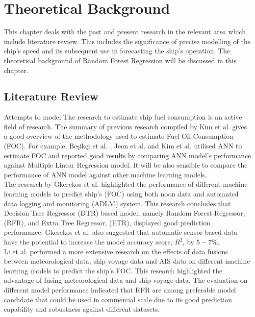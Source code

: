 \section{Theoretical Background} \label{theory}

This chapter deals with the past and present research in the relevant area which include literature review. This includes 
the significance of precise modelling of the ship's speed and its subsequent use in forecasting the ship's operation.
The theoretical background of Random Forest Regression will be discussed in this chapter. 

\subsection{Literature Review}\label{litreview}

Attempts to model 
The research to estimate ship fuel consumption is an active field of research. The summary of previous research compiled by Kim et al. \cite{Kim.2021} gives a good overview of the methodology used to estimate Fuel Oil Consumption (FOC). For example, {Be{\c{s}}ik{\c{c}}i} et al. \cite{BalBesikci.2016}, Jeon et al. \cite{Jeon.2018} and Kim et al. \cite{Kim.2021} utilised ANN to estimate FOC and reported good results by comparing ANN model's performance against Multiple Linear Regression model. It will be also sensible to compare the performance of ANN model against other machine learning models. \\

The research by Gkerekos et al. \cite{Gkerekos.2019} highlighted the performance of different machine learning models to predict ship's (FOC) using both noon data and automated data logging and monitoring (ADLM) system. This research concludes that Decision Tree Regressor (DTR) based model, namely Random Forest Regressor, (RFR), and Extra Tree Regressor, (ETR), displayed good prediction performance. Gkerekos et al. \cite{Gkerekos.2019} also suggested that automatic sensor based data have the potential to increase the model accuracy score, $R^2$, by $5-7\%$.\\

Li et al. \cite{Li.2022} performed a more extensive research on the effects of data fusions between meteorological data, ship voyage data and AIS data on different machine learning models to predict the ship's FOC. This research highlighted the advantage of fusing meteorological data and ship voyage data. The evaluation on different model performance indicated that RFR are among preferable model candidate that could be used in commercial scale due to its good prediction capability and robustness against different datasets.\\

